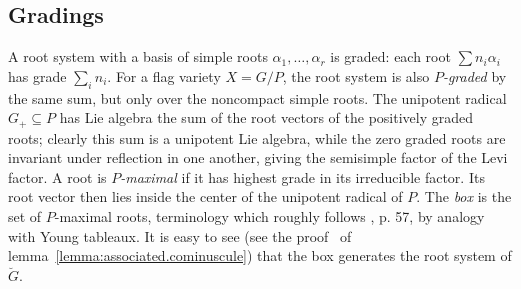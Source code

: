 \documentclass[a4paper,10pt]{amsart}
\theoremstyle{remark}
\begin{document}
\subsection{Gradings}
A root system with a basis of simple roots \(\alpha_1,\dots,\alpha_r\) is graded: each root \(\sum n_i \alpha_i\) has grade \(\sum_i n_i\).
For a flag variety \(X=G/P\), the root system is also \emph{\(P\)-graded} by the same sum, but only over the noncompact simple roots.
The unipotent radical \(G_+\subseteq P\) has Lie algebra the sum of the root vectors of the positively graded roots; clearly this sum is a unipotent Lie algebra, while the zero graded roots are invariant under reflection in one another, giving the semisimple factor of the Levi factor.
A root is \emph{\(P\)-maximal} if it has highest grade in its irreducible factor.
Its root vector then lies inside the center of the unipotent radical of \(P\).
The \emph{box} is the set of \(P\)-maximal roots, terminology which roughly follows \cite{Buch.Chaput.Mihalcea.Perrin:2018}, \cite{Lam.Williams:2008} p. 57, by analogy with Young tableaux.
It is easy to see (see the proof~ of lemma~\ref{lemma:associated.cominuscule}) that the box generates the root system of \(\breve{G}\).
\end{document}
